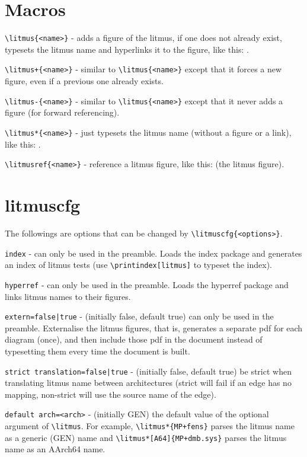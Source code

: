 \documentclass[a4paper]{article}
\begin{document}
\section{Macros}
\verb|\litmus{<name>}| - adds a figure of the litmus, if one does not
already exist, typesets the litmus name and hyperlinks it to the
figure, like this: .

\verb|\litmus+{<name>}| - similar to \verb|\litmus{<name>}| except
that it forces a new figure, even if a previous one already exists.

\verb|\litmus-{<name>}| - similar to \verb|\litmus{<name>}| except
that it never adds a figure (for forward referencing).

\verb|\litmus*{<name>}| - just typesets the litmus name (without a
figure or a link), like this: .

\vspace{4ex}

\verb|\litmusref{<name>}| - reference a litmus figure, like this:  (the  litmus figure).

\vspace{4ex}

\section{litmuscfg}
The followings are options that can be changed by
\verb|\litmuscfg{<options>}|.

\verb|index| - can only be used in the preamble. Loads the index
package and generates an index of litmus tests (use
\verb|\printindex[litmus]| to typeset the index).

\verb|hyperref| - can only be used in the preamble. Loads the hyperref
package and links litmus names to their figures.

\verb!extern=false|true! - (initially false, default true) can only be
used in the preamble. Externalise the litmus figures, that is,
generates a separate pdf for each diagram (once), and then include
those pdf in the document instead of typesetting them every time the
document is built.

\verb!strict translation=false|true! - (initially false, default true)
be strict when translating litmus name between architectures (strict
will fail if an edge has no mapping, non-strict will use the source
name of the edge).

\verb|default arch=<arch>| - (initially GEN) the default value of the
optional argument of \verb|\litmus|.
For example, \verb|\litmus*{MP+fens}| parses the litmus name as a
generic (GEN) name and \verb|\litmus*[A64]{MP+dmb.sys}| parses the
litmus name as an AArch64 name.
\end{document}
